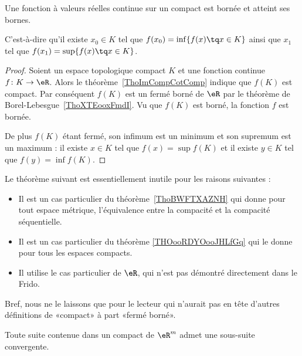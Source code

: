 \begin{theorem}\label{ThoMKKooAbHaro}
    Une fonction à valeurs réelles continue sur un compact est bornée et atteint ses bornes.

	C'est-à-dire qu'il existe $x_0\in K$ tel que $f(x_0)=\inf\{ f(x)\tq x\in K \}$ ainsi que $x_1$ tel que $f(x_1)=\sup\{ f(x)\tq x\in K \}$.
\end{theorem}

\begin{proof}
    Soient un espace topologique compact \( K\) et une fonction continue \( f\colon K\to \eR\). Alors le théorème~\ref{ThoImCompCotComp} indique que \( f(K)\) est compact. Par conséquent \( f(K)\) est un fermé borné de \( \eR\) par le théorème de Borel-Lebesgue~\ref{ThoXTEooxFmdI}. Vu que \( f(K)\) est borné, la fonction \( f\) est bornée.

    De plus \( f(K)\) étant fermé, son infimum est un minimum et son supremum est un maximum : il existe \( x\in K\) tel que \( f(x)=\sup f(K)\) et il existe \( y\in K\) tel que \( f(y)=\inf f(K)\).
\end{proof}

Le théorème suivant est essentiellement inutile pour les raisons suivantes :
\begin{itemize}
    \item 
        Il est un cas particulier du théorème~\ref{ThoBWFTXAZNH} qui donne pour tout espace métrique, l'équivalence entre la compacité et la compacité séquentielle.
    \item
        Il est un cas particulier du théorème \ref{THOooRDYOooJHLfGq} qui le donne pour tous les espaces compacts.
    \item
        Il utilise le cas particulier de \( \eR\), qui n'est pas démontré directement dans le Frido.
\end{itemize}
Bref, nous ne le laissons que pour le lecteur qui n'aurait pas en tête d'autres définitions de «compact» à part «fermé borné».

\begin{theorem}		\label{ThoBolzanoWeierstrassRn}
	Toute suite contenue dans un compact de \( \eR^m\) admet une sous-suite convergente.
\end{theorem}

